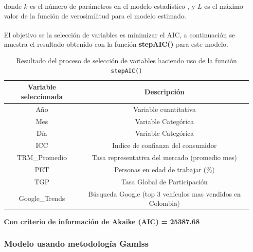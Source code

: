 \documentclass[11pt,twoside]{article}
\begin{document}
\noindent
donde $k$ es el número de parámetros en el modelo estadístico , y $L$ es el máximo valor de la función de verosimilitud para el modelo estimado.
\\
\\
El objetivo se la selección de variables es minimizar el AIC, a continuación se muestra el resultado obtenido con la función \textbf{stepAIC()} para este modelo.
\\
\begin{table}[H]
\caption{\small{Resultado del proceso de selección de variables haciendo uso de la función \texttt{stepAIC()}}}
	\label{tabla1}
\begin{tabular}{@{}cc@{}}
\toprule
Variable seleccionada & Descripción                                                   \\ \midrule
Año                   & Variable cuantitativa                                         \\
Mes                   & Variable Categórica                                           \\
Día                   & Variable Categórica                                           \\
ICC                   & Indice de confianza del consumidor                            \\
TRM\_Promedio         & Tasa representativa del mercado (promedio mes)                \\
PET                   & Personas en edad de trabajar ({\%})                           \\
TGP                   & Tasa Global de Participación                                  \\
Google\_Trends        & Búsqueda Google (top 3 vehículos mas vendidos en Colombia) \\ \bottomrule
\end{tabular}
\end{table}

\textbf{Con criterio de información de Akaike (AIC) = 25387.68}










\subsubsection{Modelo usando metodología Gamlss}
\end{document}
